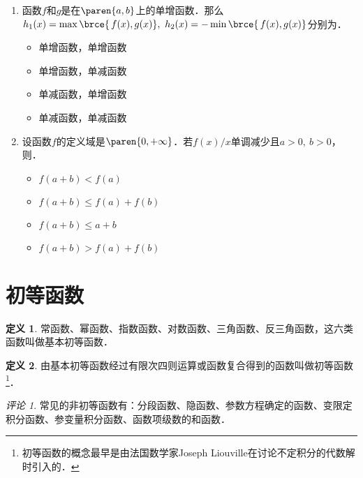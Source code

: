 \documentclass[a4paper,punct=CCT]{ctexbook}
\theoremstyle{definition}
\newtheorem*{definition*}{定义}
\theoremstyle{remark}
\newtheorem*{remark}{评论}
\newif\ifshowsol
\let\leq\leqslant
\let\le\leq
\begin{document}
\begin{enumerate}
\item 函数\(f\)和\(g\)是在\(\paren{a,b}\)上的单增函数．那么\(h_1(x) = \max\brce{\,f(x), g(x)},\ h_2(x) = -\min\brce{\,f(x), g(x)}\)分别为\uline{\makebox[6em]{}}．
  \begin{itemize}
    \renewcommand{\labelitemi}{\faCircleThin}
  \item 单增函数，单增函数
    \ifshowsol
  \item[\faCircle] 单增函数，单减函数
    \else
  \item 单增函数，单减函数
    \fi
  \item 单减函数，单增函数
  \item 单减函数，单减函数
  \end{itemize}

\item 设函数\(f\)的定义域是\(\paren{0,+\infty}\)．若\(f(x)/x\)单调减少且\(a > 0,\ b > 0\)，则\uline{\makebox[6em]{}}．
  \begin{itemize}
    \renewcommand{\labelitemi}{\faCircleThin}
  \item \(f(a+b) < f(a)\)
    \ifshowsol
  \item[\faCircle] \(f(a+b) \le f(a) + f(b)\)
    \else
  \item \(f(a+b) \le f(a) + f(b)\)
    \fi
  \item \(f(a+b) \le a + b\)
  \item \(f(a+b) > f(a) + f(b)\)
  \end{itemize}
\end{enumerate}
\fi

\section{初等函数}

\begin{definition*}
  常函数、幂函数、指数函数、对数函数、三角函数、反三角函数，这六类函数叫做基本初等函数．
\end{definition*}

\begin{definition*}
  由基本初等函数经过有限次四则运算或函数复合得到的函数叫做初等函数\footnote{初等函数的概念最早是由法国数学家Joseph Liouville在讨论不定积分的代数解时引入的．}．
\end{definition*}

\begin{remark}
  常见的非初等函数有：分段函数、隐函数、参数方程确定的函数、变限定积分函数、参变量积分函数、函数项级数的和函数．
\end{remark}
\end{document}
